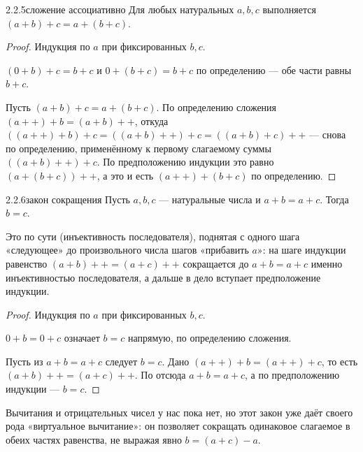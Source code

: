 \begin{proposition}{2.2.5}{сложение ассоциативно}
Для любых натуральных $a,b,c$ выполняется $(a+b)+c=a+(b+c)$.
\end{proposition}

\begin{proof}
Индукция по $a$ при фиксированных $b,c$.

 $(0+b)+c=b+c$ и $0+(b+c)=b+c$ по определению — обе части равны $b+c$.

 Пусть $(a+b)+c=a+(b+c)$. По определению сложения
$(a{+}{+})+b=(a+b){+}{+}$, откуда $((a{+}{+})+b)+c = ((a+b){+}{+})+c = ((a+b)+c){+}{+}$ —
снова по определению, применённому к первому слагаемому суммы $((a+b){+}{+})+c$. По
предположению индукции это равно $(a+(b+c)){+}{+}$, а это и есть $(a{+}{+})+(b+c)$ по
определению.
\end{proof}

\begin{proposition}{2.2.6}{закон сокращения}
Пусть $a,b,c$ — натуральные числа и $a+b=a+c$. Тогда $b=c$.
\end{proposition}

\begin{intuition}
Это по сути  (инъективность последователя), поднятая с одного
шага «следующее» до произвольного числа шагов «прибавить $a$»: на шаге индукции равенство
$(a+b){+}{+}=(a+c){+}{+}$ сокращается до $a+b=a+c$ именно инъективностью последователя, а
дальше в дело вступает предположение индукции.
\end{intuition}

\begin{proof}
Индукция по $a$ при фиксированных $b,c$.

 $0+b=0+c$ означает $b=c$ напрямую, по определению сложения.

 Пусть из $a+b=a+c$ следует $b=c$. Дано $(a{+}{+})+b=(a{+}{+})+c$, то есть
$(a+b){+}{+}=(a+c){+}{+}$. По  отсюда $a+b=a+c$, а по
предположению индукции — $b=c$.
\end{proof}

\begin{remark}
Вычитания и отрицательных чисел у нас пока нет, но этот закон уже даёт своего рода
«виртуальное вычитание»: он позволяет сокращать одинаковое слагаемое в обеих частях
равенства, не выражая явно $b=(a+c)-a$.
\end{remark}


